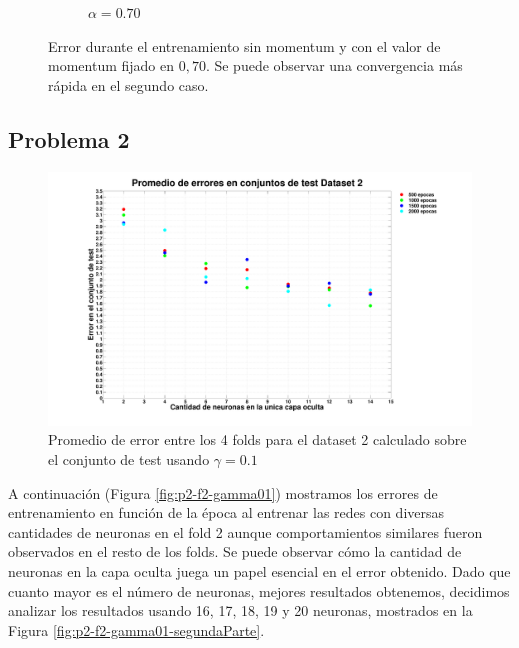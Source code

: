 \documentclass[informe.tex]{subfiles}
\begin{document}
\begin{figure}[H]
\begin{subfigure}[b]{0.30\textwidth}
                \caption{$\alpha = 0.70$}
                \label{fig:cmp_momentum_07}
        \end{subfigure}
        \caption{Error durante el entrenamiento sin momentum y con el valor de momentum fijado en $0,70$. Se puede observar una convergencia m\'as r\'apida en el segundo caso.}\label{fig:p1-f1-gamma01}
    \end{figure}
    
    \subsection{Problema 2}
    
      \begin{figure}[H]
	\begin{center}
	    \hspace*{-2cm}
	    \includegraphics[width=20cm]{graficos/d2_01.pdf}
	    \caption{Promedio de error entre los 4 folds para el dataset 2 calculado sobre el conjunto de test usando $\gamma=0.1$}
	    \label{fig:errorTest-d2}
	\end{center}
      \end{figure}
      
      \newpage
      A continuación (Figura \ref{fig:p2-f2-gamma01}) mostramos los errores de entrenamiento en función de la época al entrenar las redes con diversas cantidades de neuronas en el fold 2 aunque comportamientos similares fueron observados en el resto de los folds. Se puede observar cómo la cantidad de neuronas en la capa oculta juega un papel esencial en el error obtenido. Dado que cuanto mayor es el número de neuronas, mejores resultados obtenemos, decidimos analizar los resultados usando 16, 17, 18, 19 y 20 neuronas, mostrados en la Figura \ref{fig:p2-f2-gamma01-segundaParte}.
      
\end{document}
